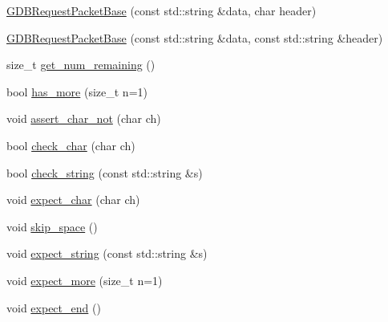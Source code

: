 \begin{DoxyCompactItemize}
\item 
\mbox{\hyperlink{classxd_1_1dbg_1_1gdbstub_1_1pkt_1_1_g_d_b_request_packet_base_ae91027b9e0fa4845ddd377e981d8c959}{G\+D\+B\+Request\+Packet\+Base}} (const std\+::string \&data, char header)
\item 
\mbox{\hyperlink{classxd_1_1dbg_1_1gdbstub_1_1pkt_1_1_g_d_b_request_packet_base_a52bfefeb64180e1ce450bc9a476d79a3}{G\+D\+B\+Request\+Packet\+Base}} (const std\+::string \&data, const std\+::string \&header)
\item 
size\+\_\+t \mbox{\hyperlink{classxd_1_1dbg_1_1gdbstub_1_1pkt_1_1_g_d_b_request_packet_base_ad691a1ad410208fa75361abd5de19d7a}{get\+\_\+num\+\_\+remaining}} ()
\item 
bool \mbox{\hyperlink{classxd_1_1dbg_1_1gdbstub_1_1pkt_1_1_g_d_b_request_packet_base_a384062ad2fc3555a5daa916648ee997c}{has\+\_\+more}} (size\+\_\+t n=1)
\item 
void \mbox{\hyperlink{classxd_1_1dbg_1_1gdbstub_1_1pkt_1_1_g_d_b_request_packet_base_a2a4be68e98b1f24b82ea8f665a32a271}{assert\+\_\+char\+\_\+not}} (char ch)
\item 
bool \mbox{\hyperlink{classxd_1_1dbg_1_1gdbstub_1_1pkt_1_1_g_d_b_request_packet_base_a245c693152f9c87b79614931f91da08c}{check\+\_\+char}} (char ch)
\item 
bool \mbox{\hyperlink{classxd_1_1dbg_1_1gdbstub_1_1pkt_1_1_g_d_b_request_packet_base_a94d43cd3e182e2d146f48d2a68e5ce01}{check\+\_\+string}} (const std\+::string \&s)
\item 
void \mbox{\hyperlink{classxd_1_1dbg_1_1gdbstub_1_1pkt_1_1_g_d_b_request_packet_base_a171e70d7acee1595cd3455bac8cf0877}{expect\+\_\+char}} (char ch)
\item 
void \mbox{\hyperlink{classxd_1_1dbg_1_1gdbstub_1_1pkt_1_1_g_d_b_request_packet_base_a40dc176fb6bcf5843a8a2108d6060199}{skip\+\_\+space}} ()
\item 
void \mbox{\hyperlink{classxd_1_1dbg_1_1gdbstub_1_1pkt_1_1_g_d_b_request_packet_base_abcd0e8c883c9b5d93f859ea62b40b2cf}{expect\+\_\+string}} (const std\+::string \&s)
\item 
void \mbox{\hyperlink{classxd_1_1dbg_1_1gdbstub_1_1pkt_1_1_g_d_b_request_packet_base_a0e23e088ee8e9eaca62ff6593edebfbd}{expect\+\_\+more}} (size\+\_\+t n=1)
\item 
void \mbox{\hyperlink{classxd_1_1dbg_1_1gdbstub_1_1pkt_1_1_g_d_b_request_packet_base_a5a55f0e2b425221912465c966827179b}{expect\+\_\+end}} ()
\item 

\end{DoxyCompactItemize}
